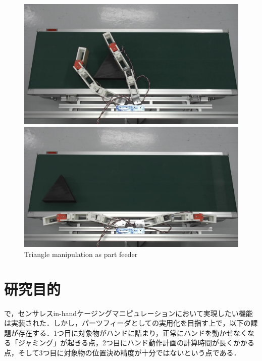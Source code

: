 \documentclass[a4paper,twoside,12pt,papersize, dvipdfmx]{iirthesis}
\begin{document}
\begin{figure}[b]
\begin{minipage}{0.49\hsize}
\subcaption{}
\end{minipage}\\
\begin{minipage}{0.49\hsize}
\centering
\includegraphics[width=\hsize]{fig/1-introduction/triangle_Moment_5.jpg}
\subcaption{}
\end{minipage}\hfill
\begin{minipage}{0.49\hsize}
\centering
\includegraphics[width=\hsize]{fig/1-introduction/triangle_Moment_7.jpg}
\subcaption{}
\end{minipage}
\caption{Triangle manipulation as part feeder \cite{kamikukita2022}}
\label{fig::intro::trimani}
\end{figure}

\section{研究目的}\label{sec::intro::objective}
\cite{komiyama2021}で，センサレスin-handケージングマニピュレーションにおいて実現したい機能は実装された．しかし，パーツフィーダとしての実用化を目指す上で，以下の課題が存在する．1つ目に対象物がハンドに詰まり，正常にハンドを動かせなくなる「ジャミング」が起きる点，2つ目にハンド動作計画の計算時間が長くかかる点，そして3つ目に対象物の位置決め精度が十分ではないという点である．\par
\end{document}
